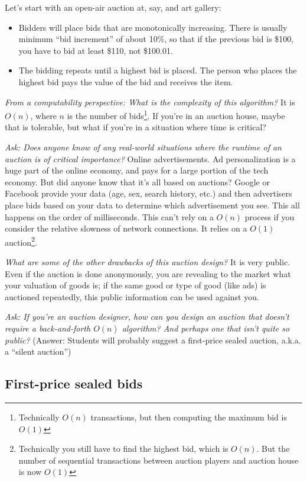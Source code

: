 \documentclass[11pt]{article}
\begin{document}
Let's start with an open-air auction at, say, and art gallery:
\begin{itemize}
    \item Bidders will place bids that are monotonically increasing. There is usually minimum ``bid increment'' of about 10\%, so that if the previous bid is \$100, you have to bid at least \$110, not \$100.01. 
    \item The bidding repeats until a highest bid is placed. The person who places the highest bid pays the value of the bid and receives the item.
\end{itemize}

{\it From a computability perspective: What is the complexity of this algorithm?} It is $O(n)$, where $n$ is the number of bids\footnote{Technically $O(n)$ transactions, but then computing the maximum bid is $O(1)$}. If you're in an auction house, maybe that is tolerable, but what if you're in a situation where time is critical? 

{\it Ask: Does anyone know of any real-world situations where the runtime of an auction is of critical importance?}
Online advertisements. Ad personalization is a huge part of the online economy, and pays for a large portion of the tech economy. But did anyone know that it's all based on auctions? Google or Facebook provide your data (age, sex, search history, etc.) and then advertisers place bids based on your data to determine which advertisement you see. This all happens on the order of milliseconds. This can't rely on a $O(n)$ process if you consider the relative slowness of network connections. It relies on a $O(1)$ auction\footnote{Technically you still have to find the highest bid, which is $O(n)$. But the number of sequential transactions between auction players and auction house is now $O(1)$}.

{\it What are some of the other drawbacks of this auction design?} It is very public. Even if the auction is done anonymously, you are revealing to the market what your valuation of goods is; if the same good or type of good (like ads) is auctioned repeatedly, this public information can be used against you. 

{\it Ask: If you're an auction designer, how can you design an auction that doesn't require a back-and-forth $O(n)$ algorithm? And perhaps one that isn't quite so public?} (Answer: Students will probably suggest a first-price sealed auction, a.k.a. a ``silent auction'')


\subsection{First-price sealed bids}
\end{document}

